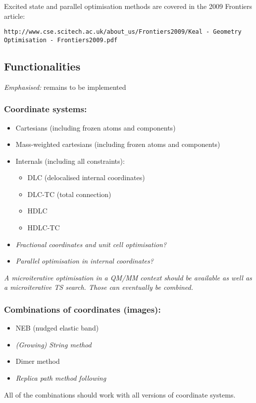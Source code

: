 \documentclass{article}
\begin{document}
Excited state and parallel optimisation methods are covered in the 2009 Frontiers article: 

\texttt{http://www.cse.scitech.ac.uk/about\_us/Frontiers2009/Keal - Geometry Optimisation - Frontiers2009.pdf}

\subsection{Functionalities}

\emph{Emphasised:} remains to be implemented

\subsubsection{Coordinate systems:}
\begin{itemize}
\item Cartesians (including frozen atoms and components)
\item Mass-weighted cartesians (including frozen atoms and components)
\item Internals (including all constraints): 
  \begin{itemize}
  \item DLC (delocalised internal coordinates)
  \item DLC-TC (total connection)
  \item HDLC
  \item HDLC-TC
  \end{itemize}
\item \emph{Fractional coordinates and unit cell optimisation?}
\item \emph{Parallel optimisation in internal coordinates?}
\end{itemize}

\emph{A microiterative optimisation in a QM/MM context should be available as
  well as a microiterative TS search. Those can eventually be combined.}

\subsubsection{Combinations of coordinates (images):}
\begin{itemize}
\item NEB (nudged elastic band)
\item \emph{(Growing) String method}
\item Dimer method \cite{hen99,hey05,kae08}
\item \emph{Replica path method following \cite{woo03}}
\end{itemize}
All of the combinations should work with all versions of coordinate systems.
\end{document}
